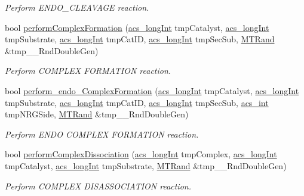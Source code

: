 \begin{DoxyCompactItemize}
\begin{DoxyCompactList}\small\item\em Perform E\-N\-D\-O\-\_\-\-C\-L\-E\-A\-V\-A\-G\-E reaction. \end{DoxyCompactList}\item 
bool \hyperlink{a00003_aaf4f4f6be28edb182d2a2516c9394f9b}{perform\-Complex\-Formation} (\hyperlink{a00016_a19319d75f02db4308bc5c0026d98cd85}{acs\-\_\-long\-Int} tmp\-Catalyst, \hyperlink{a00016_a19319d75f02db4308bc5c0026d98cd85}{acs\-\_\-long\-Int} tmp\-Substrate, \hyperlink{a00016_a19319d75f02db4308bc5c0026d98cd85}{acs\-\_\-long\-Int} tmp\-Cat\-I\-D, \hyperlink{a00016_a19319d75f02db4308bc5c0026d98cd85}{acs\-\_\-long\-Int} tmp\-Sec\-Sub, \hyperlink{a00008}{M\-T\-Rand} \&tmp\-\_\-\-\_\-\-Rnd\-Double\-Gen)
\begin{DoxyCompactList}\small\item\em Perform C\-O\-M\-P\-L\-E\-X F\-O\-R\-M\-A\-T\-I\-O\-N reaction. \end{DoxyCompactList}\item 
bool \hyperlink{a00003_ae942db2453c56b60250a5d43452b91a5}{perform\-\_\-endo\-\_\-\-Complex\-Formation} (\hyperlink{a00016_a19319d75f02db4308bc5c0026d98cd85}{acs\-\_\-long\-Int} tmp\-Catalyst, \hyperlink{a00016_a19319d75f02db4308bc5c0026d98cd85}{acs\-\_\-long\-Int} tmp\-Substrate, \hyperlink{a00016_a19319d75f02db4308bc5c0026d98cd85}{acs\-\_\-long\-Int} tmp\-Cat\-I\-D, \hyperlink{a00016_a19319d75f02db4308bc5c0026d98cd85}{acs\-\_\-long\-Int} tmp\-Sec\-Sub, \hyperlink{a00016_a8d277355641a098190360234e2ebde35}{acs\-\_\-int} tmp\-N\-R\-G\-Side, \hyperlink{a00008}{M\-T\-Rand} \&tmp\-\_\-\-\_\-\-Rnd\-Double\-Gen)
\begin{DoxyCompactList}\small\item\em Perform E\-N\-D\-O C\-O\-M\-P\-L\-E\-X F\-O\-R\-M\-A\-T\-I\-O\-N reaction. \end{DoxyCompactList}\item 
bool \hyperlink{a00003_a5c5e57b0558067cbf55c894f33d0a121}{perform\-Complex\-Dissociation} (\hyperlink{a00016_a19319d75f02db4308bc5c0026d98cd85}{acs\-\_\-long\-Int} tmp\-Complex, \hyperlink{a00016_a19319d75f02db4308bc5c0026d98cd85}{acs\-\_\-long\-Int} tmp\-Catalyst, \hyperlink{a00016_a19319d75f02db4308bc5c0026d98cd85}{acs\-\_\-long\-Int} tmp\-Substrate, \hyperlink{a00008}{M\-T\-Rand} \&tmp\-\_\-\-\_\-\-Rnd\-Double\-Gen)
\begin{DoxyCompactList}\small\item\em Perform C\-O\-M\-P\-L\-E\-X D\-I\-S\-A\-S\-S\-O\-C\-I\-A\-T\-I\-O\-N reaction. \end{DoxyCompactList}\item 

\end{DoxyCompactItemize}
